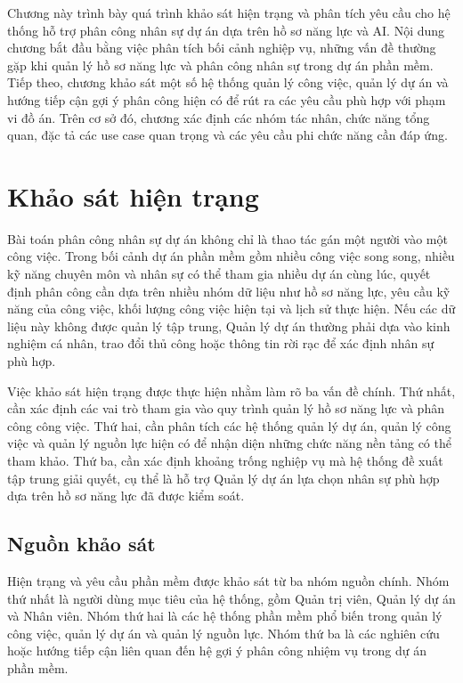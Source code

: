 \documentclass[../DoAn.tex]{subfiles}
\begin{document}
Chương này trình bày quá trình khảo sát hiện trạng và phân tích yêu cầu cho hệ thống hỗ trợ phân công nhân sự dự án dựa trên hồ sơ năng lực và AI. Nội dung chương bắt đầu bằng việc phân tích bối cảnh nghiệp vụ, những vấn đề thường gặp khi quản lý hồ sơ năng lực và phân công nhân sự trong dự án phần mềm. Tiếp theo, chương khảo sát một số hệ thống quản lý công việc, quản lý dự án và hướng tiếp cận gợi ý phân công hiện có để rút ra các yêu cầu phù hợp với phạm vi đồ án. Trên cơ sở đó, chương xác định các nhóm tác nhân, chức năng tổng quan, đặc tả các use case quan trọng và các yêu cầu phi chức năng cần đáp ứng.

\section{Khảo sát hiện trạng}
\label{section:2.1}
Bài toán phân công nhân sự dự án không chỉ là thao tác gán một người vào một công việc. Trong bối cảnh dự án phần mềm gồm nhiều công việc song song, nhiều kỹ năng chuyên môn và nhân sự có thể tham gia nhiều dự án cùng lúc, quyết định phân công cần dựa trên nhiều nhóm dữ liệu như hồ sơ năng lực, yêu cầu kỹ năng của công việc, khối lượng công việc hiện tại và lịch sử thực hiện. Nếu các dữ liệu này không được quản lý tập trung, Quản lý dự án thường phải dựa vào kinh nghiệm cá nhân, trao đổi thủ công hoặc thông tin rời rạc để xác định nhân sự phù hợp.

Việc khảo sát hiện trạng được thực hiện nhằm làm rõ ba vấn đề chính. Thứ nhất, cần xác định các vai trò tham gia vào quy trình quản lý hồ sơ năng lực và phân công công việc. Thứ hai, cần phân tích các hệ thống quản lý dự án, quản lý công việc và quản lý nguồn lực hiện có để nhận diện những chức năng nền tảng có thể tham khảo. Thứ ba, cần xác định khoảng trống nghiệp vụ mà hệ thống đề xuất tập trung giải quyết, cụ thể là hỗ trợ Quản lý dự án lựa chọn nhân sự phù hợp dựa trên hồ sơ năng lực đã được kiểm soát.

\subsection{Nguồn khảo sát}
\label{subsection:2.1.1}
Hiện trạng và yêu cầu phần mềm được khảo sát từ ba nhóm nguồn chính. Nhóm thứ nhất là người dùng mục tiêu của hệ thống, gồm Quản trị viên, Quản lý dự án và Nhân viên. Nhóm thứ hai là các hệ thống phần mềm phổ biến trong quản lý công việc, quản lý dự án và quản lý nguồn lực. Nhóm thứ ba là các nghiên cứu hoặc hướng tiếp cận liên quan đến hệ gợi ý phân công nhiệm vụ trong dự án phần mềm.
\end{document}
